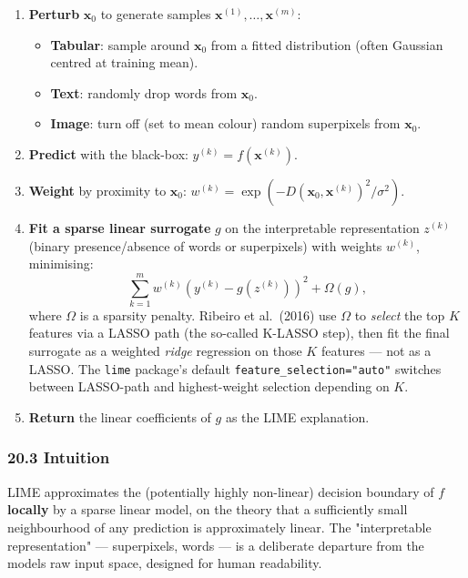 \documentclass{article}
\providecommand{\tightlist}{\setlength{\itemsep}{0pt}\setlength{\parskip}{0pt}}
\begin{document}
\begin{enumerate}
\def\labelenumi{\arabic{enumi}.}
\tightlist
\item
  \textbf{Perturb} \(\mathbf{x}_0\) to generate samples
  \(\mathbf{x}^{(1)}, \dots, \mathbf{x}^{(m)}\):

  \begin{itemize}
  \tightlist
  \item
    \textbf{Tabular}: sample around \(\mathbf{x}_0\) from a fitted
    distribution (often Gaussian centred at training mean).
  \item
    \textbf{Text}: randomly drop words from \(\mathbf{x}_0\).
  \item
    \textbf{Image}: turn off (set to mean colour) random superpixels
    from \(\mathbf{x}_0\).
  \end{itemize}
\item
  \textbf{Predict} with the black-box:
  \(y^{(k)} = f(\mathbf{x}^{(k)})\).
\item
  \textbf{Weight} by proximity to \(\mathbf{x}_0\):
  \(w^{(k)} = \exp(-D(\mathbf{x}_0, \mathbf{x}^{(k)})^2 / \sigma^2)\).
\item
  \textbf{Fit a sparse linear surrogate} \(g\) on the interpretable
  representation \(z^{(k)}\) (binary presence/absence of words or
  superpixels) with weights \(w^{(k)}\), minimising: \[
  \sum_{k=1}^{m} w^{(k)} (y^{(k)} - g(z^{(k)}))^2 + \Omega(g),
  \] where \(\Omega\) is a sparsity penalty. Ribeiro et al.\ (2016)
  use \(\Omega\) to \emph{select} the top \(K\) features via a LASSO
  path (the so-called K-LASSO step), then fit the final surrogate as
  a weighted \emph{ridge} regression on those \(K\) features --- not
  as a LASSO. The \texttt{lime} package's default
  \texttt{feature\_selection="auto"} switches between LASSO-path and
  highest-weight selection depending on \(K\).
\item
  \textbf{Return} the linear coefficients of \(g\) as the LIME
  explanation.
\end{enumerate}

\subsubsection{20.3 Intuition}\label{203-intuition}

LIME approximates the (potentially highly non-linear) decision boundary
of \(f\) \textbf{locally} by a sparse linear model, on the theory that a
sufficiently small neighbourhood of any prediction is approximately
linear. The "interpretable representation" --- superpixels, words --- is
a deliberate departure from the model\textquotesingle s raw input space,
designed for human readability.
\end{document}
